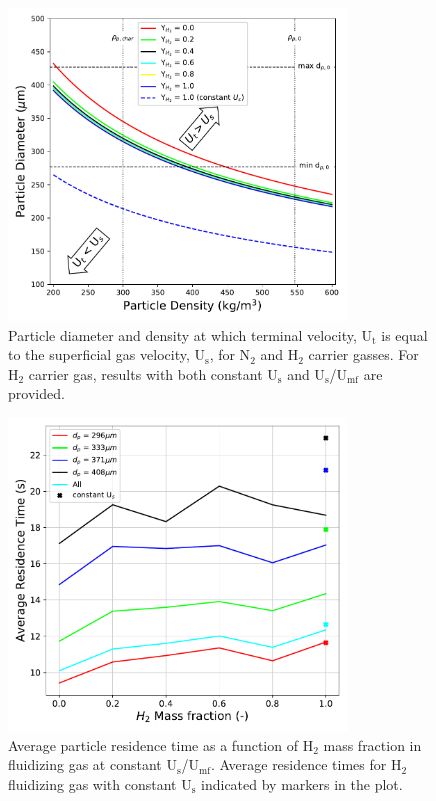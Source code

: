 \documentclass{article}
\begin{document}
\begin{figure}[H]
    \centering
    \includegraphics[width=0.8\textwidth]{figures/cfd-constuumf-terminal-vel.pdf}
    \caption{Particle diameter and density at which terminal velocity, U$_\text{t}$ is equal to the superficial gas velocity, U$_\text{s}$, for N$_2$ and H$_2$ carrier gasses. For H$_2$ carrier gas, results with both constant U$_\text{s}$ and U$_\text{s}$/U$_\text{mf}$ are provided.}
    \label{fig:cfd-constuumf-terminal-vel}
\end{figure}

\begin{figure}[H]
    \centering
    \includegraphics[width=0.8\textwidth]{figures/cfd-constuumf-rtd.pdf}
    \caption{Average particle residence time as a function of H$_2$ mass fraction in fluidizing gas at constant U$_\text{s}$/U$_\text{mf}$. Average residence times for H$_2$ fluidizing gas with constant U$_\text{s}$ indicated by markers in the plot.}
    \label{fig:cfd-constuumf-rtd}
\end{figure}
\end{document}
